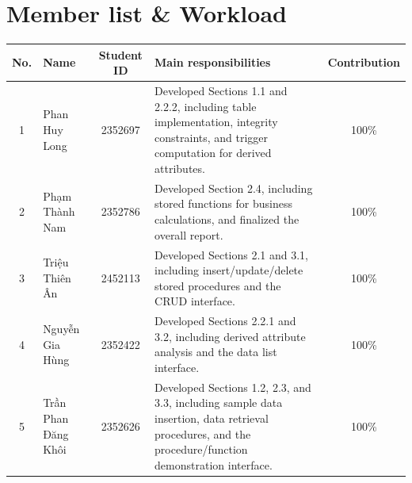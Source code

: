 \documentclass[twoside]{hcmut-report}
\begin{document}
\section*{Member list \& Workload}
\begin{center}
\begin{table}[h]
\renewcommand\thetable{1}
\centering
\small
\begin{tabular}{|c|l|c|p{7cm}|c|}
\hline
\textbf{No.} & \textbf{Name} & \textbf{Student ID} &
\textbf{Main responsibilities} & \textbf{Contribution} \\
\hline
1 & Phan Huy Long & 2352697 &
Developed Sections 1.1 and 2.2.2, including table implementation, integrity constraints, and trigger computation for derived attributes. 
& 100\% \\
\hline
2 & Phạm Thành Nam & 2352786 &
Developed Section 2.4, including stored functions for business calculations, and finalized the overall report. 
& 100\% \\
\hline
3 & Triệu Thiên Ân & 2452113 &
Developed Sections 2.1 and 3.1, including insert/update/delete stored procedures and the CRUD interface. 
& 100\% \\
\hline
4 & Nguyễn Gia Hùng & 2352422 &
Developed Sections 2.2.1 and 3.2, including derived attribute analysis and the data list interface. 
& 100\% \\
\hline
5 & Trần Phan Đăng Khôi & 2352626 &
Developed Sections 1.2, 2.3, and 3.3, including sample data insertion, data retrieval procedures, and the procedure/function demonstration interface. 
& 100\% \\
\hline
\end{tabular}
\end{table}
\end{center}
\clearpage
 

\tableofcontents

\clearpage








\end{document}
